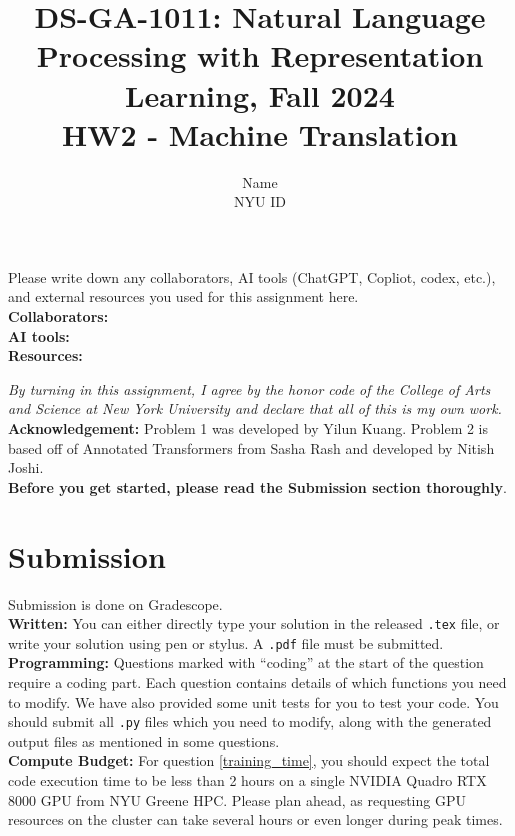 \documentclass{article}
\title{\textbf{DS-GA-1011: Natural Language Processing with Representation Learning, Fall 2024}\\HW2 - Machine Translation}
\author{Name \\
NYU ID}
\date{}
\theoremstyle{case}
\theoremstyle{definition}
\begin{document}
\maketitle
\begin{tcolorbox}
Please write down any collaborators, AI tools (ChatGPT, Copliot, codex, etc.), and external resources you used for this assignment here. \\
\textbf{Collaborators:} \\
\textbf{AI tools:} \\
\textbf{Resources:} 
\end{tcolorbox}

\textit{By turning in this assignment, I agree by the honor code of the College of Arts and Science at New York University and declare
that all of this is my own work.} \\

\textbf{Acknowledgement:} Problem 1 was developed by Yilun Kuang. Problem 2 is based off of Annotated Transformers from Sasha Rash and developed by Nitish Joshi. \\

\textbf{Before you get started, please read the Submission section thoroughly}.

\section*{Submission}
Submission is done on Gradescope. \\

\textbf{Written:} You can either directly type your solution in the released \texttt{.tex} file,
or write your solution using pen or stylus. 
A \texttt{.pdf} file must be submitted.\\

\textbf{Programming:} Questions marked with ``coding'' at the start of the question require a coding part. Each question contains details of which functions you need to modify. We have also provided some unit tests for you to test your code. You should submit all \texttt{.py} files which you need to modify, along with the generated output files as mentioned in some questions. \\

\textbf{Compute Budget:} For question \ref{training_time}, you should expect the total code execution time to be less than 2 hours on a single NVIDIA Quadro RTX 8000 GPU from NYU Greene HPC. Please plan ahead, as requesting GPU resources on the cluster can take several hours or even longer during peak times. \\
\end{document}
